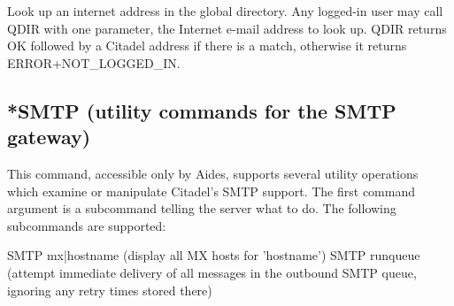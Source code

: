  Look up an internet address in the global directory.  Any logged-in user may
call QDIR with one parameter, the Internet e-mail address to look up.  QDIR
returns OK followed by a Citadel address if there is a match, otherwise it
returns ERROR+NOT_LOGGED_IN.



\subsection{*SMTP (utility commands for the SMTP gateway)}

 This command, accessible only by Aides, supports several utility operations
which examine or manipulate Citadel's SMTP support.  The first command argument
is a subcommand telling the server what to do.  The following subcommands are
supported:

      SMTP mx|hostname             (display all MX hosts for 'hostname')
      SMTP runqueue                (attempt immediate delivery of all messages
                                    in the outbound SMTP queue, ignoring any
                                    retry times stored there)



